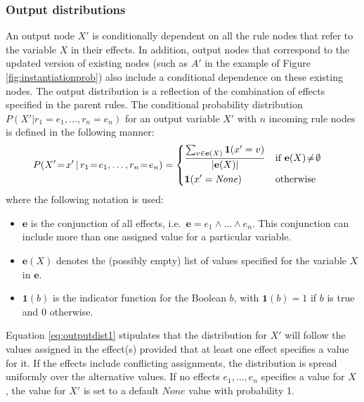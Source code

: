 \subsubsection*{Output distributions} 

An output node $X'$ is conditionally dependent on all the rule nodes that refer to the variable $X$ in their effects.  In addition, output nodes that correspond to the updated version of existing nodes (such as $A'$ in the example of Figure \ref{fig:instantiationprob}) also include a conditional dependence on these existing nodes. The output distribution is a reflection of the combination of effects specified in the parent rules. The conditional probability distribution $P(X'|r_1\!=\!e_1, \dots, r_n\!=\!e_n)$ for an output variable $X'$ with $n$ incoming rule nodes is defined in the following manner:
\begin{align}
&P(X'\!=\!x' \, | \, r_1\!=\!e_1, \dots, r_n\!=\!e_n) = \begin{dcases}
\frac{\sum_{v \in {\mathbf{e}(X)}} \mathbf{1}(x' = v)} { |\mathbf{e}(X)| } & \text{if } \mathbf{e}(X)\!\neq\!\emptyset \\
\mathbf{1}(x' = \mathit{None}) & \text{otherwise}
\end{dcases}
\label{eq:outputdist1}
\end{align}
where the following notation is used: \begin{itemize}
\item $\mathbf{e}$ is the conjunction of all effects, i.e.\ $\mathbf{e} = e_1 \land \dots \land e_n$.  This conjunction can include more than one assigned value for a particular variable.
\item $\mathbf{e}(X)$ denotes the (possibly empty) list of values specified for the variable $X$ in $\mathbf{e}$. 
\item $\mathbf{1}(b)$ is the indicator function for the Boolean $b$, with $\mathbf{1}(b)=1$ if $b$ is true and $0$ otherwise.
\end{itemize}

Equation \eqref{eq:outputdist1} stipulates that the distribution for $X'$ will follow the values assigned in the effect(s) provided that at least one effect specifies a value for it. If the effects include conflicting assignments, the distribution is spread uniformly over the alternative values. If no effects $e_1, \dots, e_n$ specifies a value for $X$ , the value for $X'$ is set to a default $None$ value with probability 1. 

